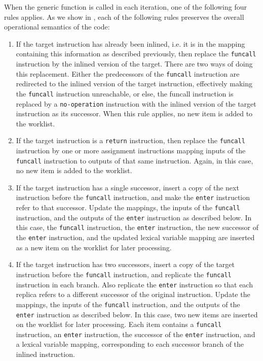 When the generic function is called in each iteration, one of the
following four rules applies.  As we show in ,
each of the following rules preserves the overall operational
semantics of the code:

\begin{enumerate}
\item If the target instruction has already been inlined, i.e. it is
  in the mapping containing this information as described previously,
  then replace the \texttt{funcall} instruction by the inlined version
  of the target.  There are two ways of doing this replacement.
  Either the predecessors of the \texttt{funcall} instruction are
  redirected to the inlined version of the target instruction,
  effectively making the \texttt{funcall} instruction unreachable, or
  else, the funcall instruction is replaced by a \texttt{no-operation}
  instruction with the inlined version of the target instruction as
  its successor.  When this rule applies, no new item is added to the
  worklist.
\item If the target instruction is a \texttt{return} instruction, then
  replace the \texttt{funcall} instruction by one or more assignment
  instructions mapping inputs of the \texttt{funcall} instruction to
  outputs of that same instruction.  Again, in this case, no new item
  is added to the worklist.
\item If the target instruction has a single successor, insert a copy
  of the next instruction before the \texttt{funcall} instruction, and
  make the \texttt{enter} instruction refer to that successor.  Update
  the mappings, the inputs of the \texttt{funcall} instruction, and
  the outputs of the \texttt{enter} instruction as described below.
  In this case, the \texttt{funcall} instruction, the \texttt{enter}
  instruction, the new successor of the \texttt{enter} instruction,
  and the updated lexical variable mapping are inserted as a new item
  on the worklist for later processing.
\item If the target instruction has two successors, insert a copy of
  the target instruction before the \texttt{funcall} instruction, and
  replicate the \texttt{funcall} instruction in each branch.  Also
  replicate the \texttt{enter} instruction so that each replica refers
  to a different successor of the original instruction.  Update the
  mappings, the inputs of the \texttt{funcall} instruction, and the
  outputs of the \texttt{enter} instruction as described below.  In
  this case, two new items are inserted on the worklist for later
  processing.  Each item contains a \texttt{funcall} instruction, an
  \texttt{enter} instruction, the successor of the \texttt{enter}
  instruction, and a lexical variable mapping, corresponding to each
  successor branch of the inlined instruction.
\end{enumerate}

